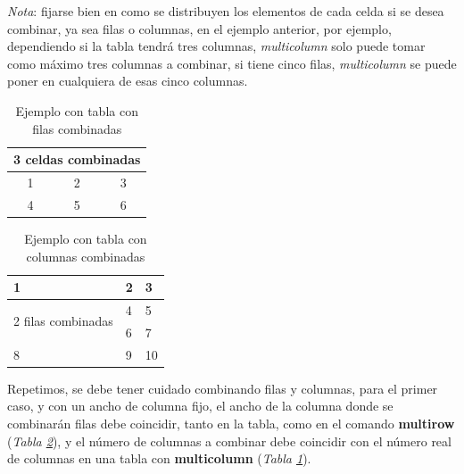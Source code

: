 \textit{Nota}: fijarse bien en como se distribuyen los elementos de cada celda si se desea combinar, ya sea filas o columnas, en el ejemplo anterior, por ejemplo, dependiendo si la tabla tendrá tres columnas, \textit{multicolumn} solo puede tomar como máximo tres columnas a combinar, si tiene cinco filas, \textit{multicolumn} se puede poner en cualquiera de esas cinco columnas.
\begin{table}[H]
    \begin{center}
        \caption{Ejemplo con tabla con filas combinadas}
        \label{tab: 5}
        \begin{tabular}{c|c|c}
            \hline
            \multicolumn{3}{c}{3 celdas combinadas} \\
            \hline
            1   & 2 & 3 \\
            4   & 5 & 6 \\
            \hline
        \end{tabular}
    \end{center}
\end{table}
\begin{table}[H]
    \begin{center}
        \caption{Ejemplo con tabla con columnas combinadas}
        \label{tab: 6}
        \begin{tabular}{m{5cm}|m{3cm}|m{1cm}}
            \hline
            1   & 2 & 3 \\
            \hline
            \multirow{2}{5cm}{2 filas combinadas}   & 4 & 5 \\
            &   6 & 7 \\
            \hline
            8   & 9 & 10 \\
            \hline
        \end{tabular}
    \end{center}
\end{table}

Repetimos, se debe tener cuidado combinando filas y columnas, para el primer caso, y con un ancho de columna fijo, el ancho de la columna donde se combinarán filas debe coincidir, tanto en la tabla, como en el comando \textbf{multirow} (\textit{Tabla \ref{tab: 6}}), y el número de columnas a combinar debe coincidir con el número real de columnas en una tabla con \textbf{multicolumn} (\textit{Tabla \ref{tab: 5}}).